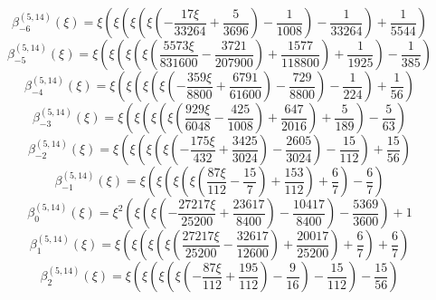\begin{equation}
\beta_{-6}^{(5,14)} (\xi) =
 \xi \left(\xi \left(\xi \left(\xi \left(- \frac{17 \xi}{33264}
 + \frac{5}{3696}\right) - \frac{1}{1008}\right) - \frac{1}{33264}\right) + \frac{1}{5544}\right)
\end{equation}
\begin{equation}
\beta_{-5}^{(5,14)} (\xi) =
 \xi \left(\xi \left(\xi \left(\xi \left(\frac{5573 \xi}{831600}
 - \frac{3721}{207900}\right) + \frac{1577}{118800}\right) + \frac{1}{1925}\right) - \frac{1}{385}\right)
\end{equation}
\begin{equation}
\beta_{-4}^{(5,14)} (\xi) =
 \xi \left(\xi \left(\xi \left(\xi \left(- \frac{359 \xi}{8800}
 + \frac{6791}{61600}\right) - \frac{729}{8800}\right) - \frac{1}{224}\right) + \frac{1}{56}\right)
\end{equation}
\begin{equation}
\beta_{-3}^{(5,14)} (\xi) =
 \xi \left(\xi \left(\xi \left(\xi \left(\frac{929 \xi}{6048}
 - \frac{425}{1008}\right) + \frac{647}{2016}\right) + \frac{5}{189}\right) - \frac{5}{63}\right)
\end{equation}
\begin{equation}
\beta_{-2}^{(5,14)} (\xi) =
 \xi \left(\xi \left(\xi \left(\xi \left(- \frac{175 \xi}{432}
 + \frac{3425}{3024}\right) - \frac{2605}{3024}\right) - \frac{15}{112}\right) + \frac{15}{56}\right)
\end{equation}
\begin{equation}
\beta_{-1}^{(5,14)} (\xi) =
 \xi \left(\xi \left(\xi \left(\xi \left(\frac{87 \xi}{112}
 - \frac{15}{7}\right) + \frac{153}{112}\right) + \frac{6}{7}\right) - \frac{6}{7}\right)
\end{equation}
\begin{equation}
\beta_{0}^{(5,14)} (\xi) =
 \xi^{2} \left(\xi \left(\xi \left(- \frac{27217 \xi}{25200}
 + \frac{23617}{8400}\right) - \frac{10417}{8400}\right) - \frac{5369}{3600}\right) + 1
\end{equation}
\begin{equation}
\beta_{1}^{(5,14)} (\xi) =
 \xi \left(\xi \left(\xi \left(\xi \left(\frac{27217 \xi}{25200}
 - \frac{32617}{12600}\right) + \frac{20017}{25200}\right) + \frac{6}{7}\right) + \frac{6}{7}\right)
\end{equation}
\begin{equation}
\beta_{2}^{(5,14)} (\xi) =
 \xi \left(\xi \left(\xi \left(\xi \left(- \frac{87 \xi}{112}
 + \frac{195}{112}\right) - \frac{9}{16}\right) - \frac{15}{112}\right) - \frac{15}{56}\right)
\end{equation}
